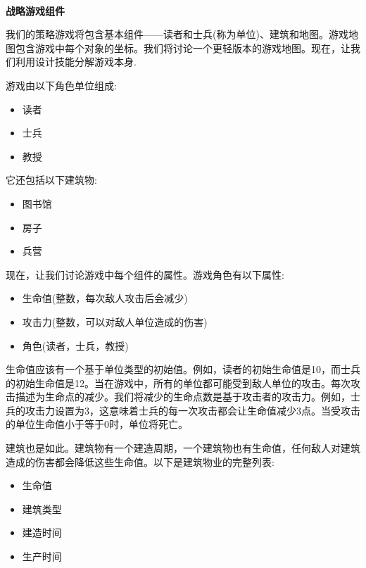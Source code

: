 \noindent\textbf{}\ \par
\textbf{战略游戏组件} \ \par
我们的策略游戏将包含基本组件——读者和士兵(称为单位)、建筑和地图。游戏地图包含游戏中每个对象的坐标。我们将讨论一个更轻版本的游戏地图。现在，让我们利用设计技能分解游戏本身. \par
游戏由以下角色单位组成: \par

\begin{itemize}
	\item 读者
	\item 士兵
	\item 教授
\end{itemize}

它还包括以下建筑物: \par

\begin{itemize}
	\item 图书馆
	\item 房子
	\item 兵营
\end{itemize}

现在，让我们讨论游戏中每个组件的属性。游戏角色有以下属性: \par

\begin{itemize}
	\item 生命值(整数，每次敌人攻击后会减少)
	\item 攻击力(整数，可以对敌人单位造成的伤害)
	\item 角色(读者，士兵，教授)
\end{itemize}

生命值应该有一个基于单位类型的初始值。例如，读者的初始生命值是10，而士兵的初始生命值是12。当在游戏中，所有的单位都可能受到敌人单位的攻击。每次攻击描述为生命点的减少。我们将减少的生命点数是基于攻击者的攻击力。例如，士兵的攻击力设置为3，这意味着士兵的每一次攻击都会让生命值减少3点。当受攻击的单位生命值小于等于0时，单位将死亡。 \par
建筑也是如此。建筑物有一个建造周期，一个建筑物也有生命值，任何敌人对建筑造成的伤害都会降低这些生命值。以下是建筑物业的完整列表: \par

\begin{itemize}
	\item 生命值
	\item 建筑类型
	\item 建造时间
	\item 生产时间
\end{itemize}

